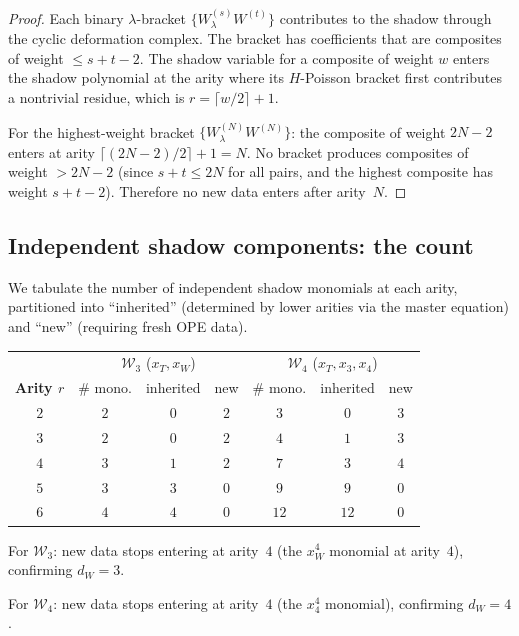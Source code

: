 \documentclass[11pt]{article}
\newcommand{\cW}{\mathcal{W}}
\begin{document}
\begin{proof}
Each binary $\lambda$-bracket $\{W^{(s)}_\lambda W^{(t)}\}$
contributes to the shadow through the cyclic deformation
complex.  The bracket has coefficients that are composites of
weight $\le s + t - 2$.  The shadow variable for a composite of
weight $w$ enters the shadow polynomial at the arity where its
$H$-Poisson bracket first contributes a nontrivial residue,
which is $r = \lceil w/2 \rceil + 1$.

For the highest-weight bracket
$\{W^{(N)}_\lambda W^{(N)}\}$: the composite of weight
$2N - 2$ enters at arity $\lceil(2N-2)/2\rceil + 1 = N$.
No bracket produces composites of weight $> 2N - 2$
(since $s + t \le 2N$ for all pairs, and the highest composite
has weight $s + t - 2$).  Therefore no new data enters after
arity~$N$.
\end{proof}

\subsection*{Independent shadow components: the count}

We tabulate the number of independent shadow monomials at each
arity, partitioned into ``inherited'' (determined by lower
arities via the master equation) and ``new'' (requiring
fresh OPE data).

\begin{center}
\small
\renewcommand{\arraystretch}{1.25}
\begin{tabular}{c|ccc|ccc}
\multicolumn{1}{c}{} &
\multicolumn{3}{|c|}{$\cW_3$ ($x_T, x_W$)} &
\multicolumn{3}{c}{$\cW_4$ ($x_T, x_3, x_4$)} \\
\textbf{Arity $r$} & \# mono. & inherited & new
  & \# mono. & inherited & new \\
\hline
$2$ & $2$ & $0$ & $2$ & $3$ & $0$ & $3$ \\
$3$ & $2$ & $0$ & $2$ & $4$ & $1$ & $3$ \\
$4$ & $3$ & $1$ & $2$ & $7$ & $3$ & $4$ \\
$5$ & $3$ & $3$ & $0$ & $9$ & $9$ & $0$ \\
$6$ & $4$ & $4$ & $0$ & $12$ & $12$ & $0$ \\
\end{tabular}
\end{center}

\noindent
For $\cW_3$: new data stops entering at arity~$4$ (the
$x_W^4$ monomial at arity~$4$), confirming $d_W = 3$.

For $\cW_4$: new data stops entering at arity~$4$ (the
$x_4^4$ monomial), confirming $d_W = 4$.
\end{document}
